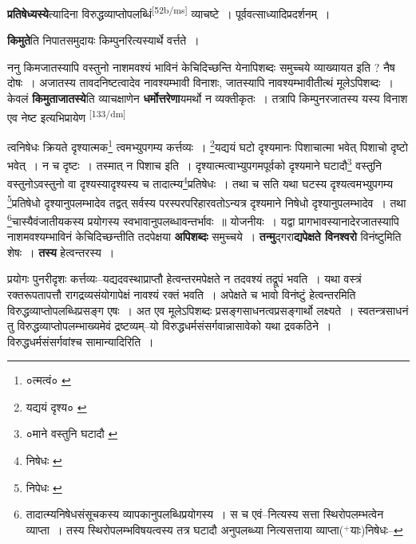 \documentclass[article,12pt,a4paper]{memoir}
\newcommand{\add}[1]{($^{+}$#1)}
\begin{document}
	  \pstart \textbf{प्रतिषेध्यस्ये}त्यादिना विरुद्धव्याप्तोपलब्धिं\leavevmode\textsuperscript{\rmlatinfont\tiny [52b/ms]} व्याचष्टे । पूर्ववत्साध्यादिप्रदर्शनम् ।
	\pend
      

	  \pstart \textbf{किमुते}ति निपातसमुदायः किम्पुनरित्यस्यार्थे वर्त्तते ।
	\pend
      

	  \pstart ननु किमजातस्यापि वस्तुनो नाशमवश्यं भाविनं केचिदिच्छन्ति येनापिशब्दः समुच्चये व्याख्यायत इति ? नैष दोषः । अजातस्य तावदनिष्टत्वादेव नावश्यम्भावी विनाशः, जातस्यापि नावश्यम्भावीतीत्थं मूलेऽपिशब्दः । केवलं \textbf{किमुताजातस्ये}ति व्याचक्षाणेन \textbf{धर्मोत्तरेणा}यमर्थो न व्यक्तीकृतः । तत्रापि किम्पुनरजातस्य यस्य विनाश एव नेष्ट इत्यभिप्रायेण  \leavevmode\textsuperscript{\rmlatinfont\tiny [133/dm]} 
	  
	त्वनिषेधः क्रियते दृश्यात्मक\footnote{०त्मत्वं० \cite{dp-msA} \cite{dp-edP} \cite{dp-edH} \cite{dp-edE} \cite{dp-edN}} त्वमभ्युपगम्य कर्त्तव्यः । \footnote{यद्ययं दृश्य० \cite{dp-msA} \cite{dp-edP} \cite{dp-edH} \cite{dp-edE} \cite{dp-edN}}यद्ययं घटो दृश्यमानः पिशाचात्मा भवेत् पिशाचो दृष्टो भवेत् । न च दृष्टः । तस्मात् न पिशाच इति । दृश्यात्मत्वाभ्युपगमपूर्वको दृश्यमाने घटादौ\footnote{०माने वस्तुनि घटादौ \cite{dp-msC}} वस्तुनि वस्तुनोऽवस्तुनो वा दृश्यस्यादृश्यस्य च तादात्म्य\footnote{निषेधः \cite{dp-msA} \cite{dp-msB} \cite{dp-edP} \cite{dp-edH} \cite{dp-edE} \cite{dp-edN}}प्रतिषेधः । तथा च सति यथा घटस्य दृश्यत्वमभ्युपगम्य \footnote{निपेधः \cite{dp-msB}}प्रतिषेधो दृश्यानुपलम्भादेव तद्वत् सर्वस्य परस्परपरिहारवतोऽन्यत्र दृश्यमाने निषेधो दृश्यानुपलम्भादेव । तथा \footnote{तादात्म्यनिषेधसंसूचकस्य व्यापकानुपलब्धिप्रयोगस्य । स च एवं--नित्यस्य सत्ता स्थिरोपलम्भत्वेन व्याप्ता । तस्य स्थिरोपलम्भविषयत्वस्य तत्र घटादौ अनुपलब्ध्या नित्यसत्ताया व्याप्ता\add{याः}निषेधः--\cite{dp-msD-n}}चास्यैवंजातीयकस्य प्रयोगस्य स्वभावानुपलब्धावन्तर्भावः ॥ योजनीयः । यद्वा प्रागभावस्यानादेरजातस्यापि नाशमवश्यम्भाविनं केचिदिच्छन्तीति तदपेक्षया \textbf{अपिशब्दः} समुच्चये । \textbf{तन्मु}द्गरा\textbf{द्यपेक्षते विनश्वरो} विनंष्टुमिति शेषः । \textbf{तस्य} हेत्वन्तरस्य ।
	\pend
      

	  \pstart प्रयोगः पुनरीदृशः कर्त्तव्यः--यद्यदवस्थाप्राप्तौ हेत्वन्तरमपेक्षते न तदवश्यं तद्रूपं भवति । यथा वस्त्रं रक्तरूपतापत्तौ रागद्रव्यसंयोगापेक्षं नावश्यं रक्तं भवति । अपेक्षते च भावो विनंष्टुं हेत्वन्तरमिति विरुद्धव्याप्तोपलब्धिप्रसङ्ग एषः । अत एव मूलेऽपिशब्दः प्रसङ्गसाधनत्वप्रसङ्गार्थो लक्ष्यते । स्वतन्त्रसाधनं तु विरुद्धव्याप्तोपलम्भाख्यमेवं द्रष्टव्यम्--यो विरुद्धधर्मसंसर्गवान्नासावेको यथा द्रवकठिने । विरुद्धधर्मसंसर्गवांश्च सामान्यादिरिति ।
	\pend
      
\end{document}
